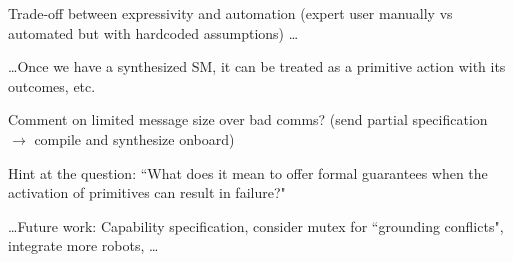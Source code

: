 
Trade-off between expressivity and automation (expert user manually vs automated but with hardcoded assumptions) \ldots

\ldots Once we have a synthesized SM, it can be treated as a primitive action with its outcomes, etc.

Comment on limited message size over bad comms? (send partial specification $\rightarrow$ compile and synthesize onboard)

Hint at the question: ``What does it mean to offer formal guarantees when the activation of primitives can result in failure?"

\ldots Future work: Capability specification, consider mutex for ``grounding conflicts", integrate more robots, \ldots

